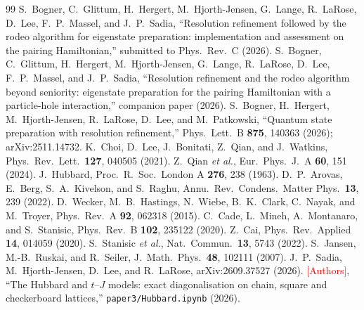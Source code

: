 \documentclass[
  aps,
  prc,
  reprint,
  superscriptaddress,
  floatfix,
  nofootinbib
]{revtex4-2}
\newcommand{\todo}[1]{\textcolor{red}{[#1]}}
\begin{document}
\begin{thebibliography}{99}
 S.~Bogner, C.~Glittum, H.~Hergert,
M.~Hjorth-Jensen, G.~Lange, R.~LaRose, D.~Lee, F.~P.~Massel, and J.~P.~Sadia,
``Resolution refinement followed by the rodeo algorithm for eigenstate
preparation: implementation and assessment on the pairing Hamiltonian,''
submitted to Phys.\ Rev.\ C (2026).
 S.~Bogner, C.~Glittum, H.~Hergert,
M.~Hjorth-Jensen, G.~Lange, R.~LaRose, D.~Lee, F.~P.~Massel, and J.~P.~Sadia,
``Resolution refinement and the rodeo algorithm beyond seniority:
eigenstate preparation for the pairing Hamiltonian with a particle-hole
interaction,'' companion paper (2026).
 S.~Bogner, H.~Hergert, M.~Hjorth-Jensen, R.~LaRose,
D.~Lee, and M.~Patkowski, ``Quantum state preparation with resolution
refinement,'' Phys.\ Lett.\ B \textbf{875}, 140363 (2026); arXiv:2511.14732.
 K.~Choi, D.~Lee, J.~Bonitati, Z.~Qian, and J.~Watkins,
Phys.\ Rev.\ Lett.\ \textbf{127}, 040505 (2021).
 Z.~Qian \emph{et al.}, Eur.\ Phys.\ J.\ A \textbf{60}, 151 (2024).
 J.~Hubbard, Proc.\ R.\ Soc.\ London A \textbf{276}, 238 (1963).
 D.~P.~Arovas, E.~Berg, S.~A.~Kivelson, and S.~Raghu,
Annu.\ Rev.\ Condens.\ Matter Phys.\ \textbf{13}, 239 (2022).
 D.~Wecker, M.~B.~Hastings, N.~Wiebe, B.~K.~Clark,
C.~Nayak, and M.~Troyer, Phys.\ Rev.\ A \textbf{92}, 062318 (2015).
 C.~Cade, L.~Mineh, A.~Montanaro, and S.~Stanisic,
Phys.\ Rev.\ B \textbf{102}, 235122 (2020).
 Z.~Cai, Phys.\ Rev.\ Applied \textbf{14}, 014059 (2020).
 S.~Stanisic \emph{et al.}, Nat.\ Commun.\ \textbf{13}, 5743 (2022).
 S.~Jansen, M.-B.~Ruskai, and R.~Seiler, J.~Math.\ Phys.\
\textbf{48}, 102111 (2007).
 J.~P.~Sadia, M.~Hjorth-Jensen, D.~Lee, and R.~LaRose,
arXiv:2609.37527 (2026).
 \todo{Authors}, ``The Hubbard and $t$--$J$ models:
exact diagonalisation on chain, square and checkerboard lattices,''
\texttt{paper3/Hubbard.ipynb} (2026).
\end{thebibliography}
\end{document}
